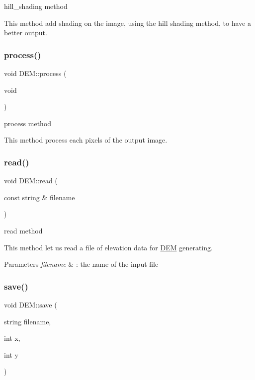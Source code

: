 hill\+\_\+shading method 

This method add shading on the image, using the hill shading method, to have a better output. \mbox{\label{classDEM_a1a9c426ce0626fea4f066b73c7045e6f}} 
\subsubsection{\texorpdfstring{process()}{process()}}
{\footnotesize\ttfamily void D\+E\+M\+::process (\begin{DoxyParamCaption}\item[{void}]{ }\end{DoxyParamCaption})}



process method 

This method process each pixels of the output image. \mbox{\label{classDEM_aa335c6a15872db8075dcfc2074bc24a1}} 
\subsubsection{\texorpdfstring{read()}{read()}}
{\footnotesize\ttfamily void D\+E\+M\+::read (\begin{DoxyParamCaption}\item[{const string \&}]{filename }\end{DoxyParamCaption})}



read method 

This method let us read a file of elevation data for \hyperlink{classDEM}{D\+EM} generating.


\begin{DoxyParams}{Parameters}
{\em filename} & \+: the name of the input file \\
\hline
\end{DoxyParams}
\mbox{\label{classDEM_a6cb0c96b5a5b2d7c0f7ac07377a64dbd}} 
\subsubsection{\texorpdfstring{save()}{save()}}
{\footnotesize\ttfamily void D\+E\+M\+::save (\begin{DoxyParamCaption}\item[{string}]{filename,  }\item[{int}]{x,  }\item[{int}]{y }\end{DoxyParamCaption})}



